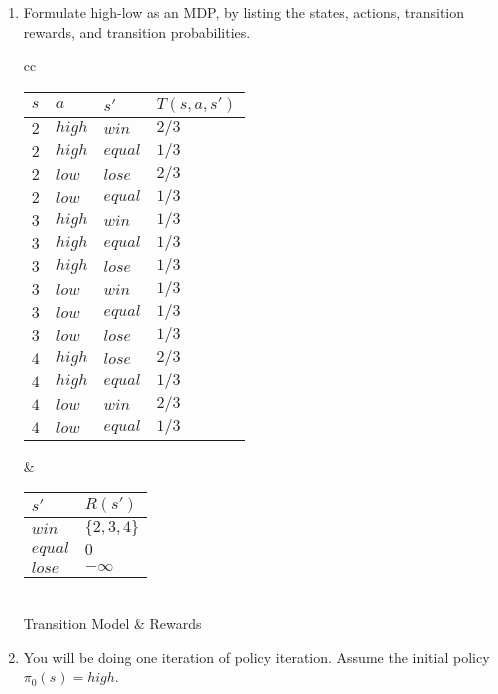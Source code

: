 \documentclass[12pt]{article}
\begin{document}
\begin{enumerate}

\item Formulate high-low as an MDP, by listing the states, actions,
  transition rewards, and transition probabilities.  

\begin{center}
\begin{tabular}{cc}
\begin{tabular}{|l|l|l|l|} \hline
$s$ & $a$ & $s'$ & $T(s,a,s')$ \\ \hline
$2$ & $high$ & $win$ & $2/3$ \\ \hline
$2$ & $high$ & $equal$ & $1/3$ \\ \hline
$2$ & $low$  & $lose$ & $2/3$ \\ \hline
$2$ & $low$  & $equal$ & $1/3$ \\ \hline
$3$ & $high$ & $win$   & $1/3$ \\ \hline
$3$ & $high$ & $equal$   & $1/3$ \\ \hline
$3$ & $high$ & $lose$ & $1/3$ \\ \hline
$3$ & $low$ & $win$   & $1/3$ \\ \hline
$3$ & $low$ & $equal$   & $1/3$ \\ \hline
$3$ & $low$ & $lose$ & $1/3$ \\ \hline
$4$ & $high$ & $lose$ & $2/3$ \\ \hline
$4$ & $high$ & $equal$ & $1/3$ \\ \hline
$4$ & $low$  & $win$ & $2/3$ \\ \hline
$4$ & $low$  & $equal$ & $1/3$ \\ \hline
\end{tabular} &
\begin{tabular}{|l|l|}\hline
$s'$       & $R(s')$ \\ \hline
$win$ & $\{2, 3, 4\}$ \\  \hline
$equal$  &  $0$ \\ \hline
$lose$ & $-\infty$  \\ \hline
\end{tabular} \\
Transition Model & Rewards
\end{tabular}
\end{center}

\item You will be doing one iteration of policy iteration.  Assume the
  initial policy $\pi_0(s) = high$.

  \begin{enumerate}


\end{enumerate}
\end{enumerate}
\end{document}

